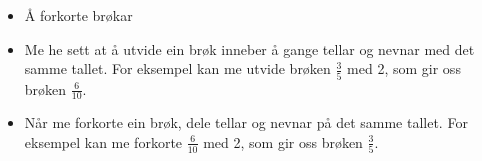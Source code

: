 \documentclass[english,hidelinks,pdftex, 11 pt, class=report,crop=false]{standalone}
\begin{document}
\begin{itemize}
\item Å forkorte brøkar
\item Me he sett at å utvide ein brøk inneber å gange tellar og nevnar med det samme tallet. For eksempel kan me utvide brøken $ \frac{3}{5} $ med 2, som gir oss brøken $ \frac{6}{10} $.
\item Når me forkorte ein brøk, dele tellar og nevnar på det samme tallet. For eksempel kan me forkorte $ \frac{6}{10} $ med 2, som gir oss brøken $ \frac{3}{5} $.
\end{itemize}
\end{document}
